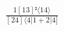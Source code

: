 \documentclass[varwidth, border=5pt]{standalone}
\begin{document}
\begin{my}
$\begin{gathered}
\scriptscriptstyle\frac{1[13]²⟨14⟩}{[24]⟨4|1+2|4]}
\end{gathered}$
\end{my}
\end{document}
